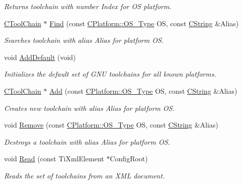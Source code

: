 \begin{DoxyCompactItemize}
\begin{DoxyCompactList}\small\item\em Returns toolchain with number {\itshape Index} for {\itshape O\-S} platform. \end{DoxyCompactList}\item 
\hyperlink{classCToolChain}{C\-Tool\-Chain} $\ast$ \hyperlink{classCToolChainSet_a5ed770a59c360e8c42d5f9cdc3239013}{Find} (const \hyperlink{classCPlatform_a2fb735c63c53052f79629e338bb0f535}{C\-Platform\-::\-O\-S\-\_\-\-Type} O\-S, const \hyperlink{classCString}{C\-String} \&Alias)
\begin{DoxyCompactList}\small\item\em Searches toolchain with alias {\itshape Alias} for platform {\itshape O\-S}. \end{DoxyCompactList}\item 
void \hyperlink{classCToolChainSet_abe8058a501f776aefa64d4071f387ad7}{Add\-Default} (void)
\begin{DoxyCompactList}\small\item\em Initializes the default set of G\-N\-U toolchains for all known platforms. \end{DoxyCompactList}\item 
\hyperlink{classCToolChain}{C\-Tool\-Chain} $\ast$ \hyperlink{classCToolChainSet_ad3e4d7f5ca7269dcc684a6d457a5914c}{Add} (const \hyperlink{classCPlatform_a2fb735c63c53052f79629e338bb0f535}{C\-Platform\-::\-O\-S\-\_\-\-Type} O\-S, const \hyperlink{classCString}{C\-String} \&Alias)
\begin{DoxyCompactList}\small\item\em Creates new toolchain with alias {\itshape Alias} for platform {\itshape O\-S}. \end{DoxyCompactList}\item 
void \hyperlink{classCToolChainSet_a5276cbe9c0dba947d787cc150714ebc2}{Remove} (const \hyperlink{classCPlatform_a2fb735c63c53052f79629e338bb0f535}{C\-Platform\-::\-O\-S\-\_\-\-Type} O\-S, const \hyperlink{classCString}{C\-String} \&Alias)
\begin{DoxyCompactList}\small\item\em Destroys a toolchain with alias {\itshape Alias} for platform {\itshape O\-S}. \end{DoxyCompactList}\item 
void \hyperlink{classCToolChainSet_a1f1d2d4df96c26271aedbcda9190d6d4}{Read} (const Ti\-Xml\-Element $\ast$Config\-Root)
\begin{DoxyCompactList}\small\item\em Reads the set of toolchains from an X\-M\-L document. \end{DoxyCompactList}\item 

\end{DoxyCompactItemize}
